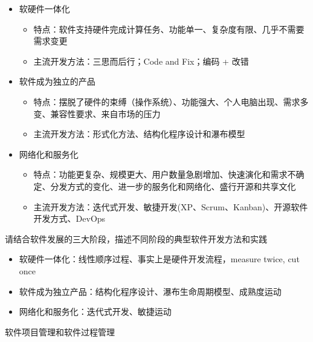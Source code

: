\begin{solution}
\begin{itemize}
    \item 软硬件一体化
    \begin{itemize}
        \item 特点：软件支持硬件完成计算任务、功能单一、复杂度有限、几乎不需要需求变更
        \item 主流开发方法：三思而后行；Code and Fix；编码 + 改错
    \end{itemize}
    \item 软件成为独立的产品
    \begin{itemize}
        \item 特点：摆脱了硬件的束缚（操作系统）、功能强大、个人电脑出现、需求多变、兼容性要求、来自市场的压力
        \item 主流开发方法：形式化方法、结构化程序设计和瀑布模型
    \end{itemize}
    \item 网络化和服务化
    \begin{itemize}
        \item 特点：功能更复杂、规模更大、用户数量急剧增加、快速演化和需求不确定、分发方式的变化、进一步的服务化和网络化、盛行开源和共享文化
        \item 主流开发方法：迭代式开发、敏捷开发(XP、Scrum、Kanban)、开源软件开发方式、DevOps
    \end{itemize}
\end{itemize}
\end{solution}



\begin{problem}[2020]
请结合软件发展的三大阶段，描述不同阶段的典型软件开发方法和实践
\end{problem}

\begin{solution}
\begin{itemize}
    \item 软硬件一体化：线性顺序过程、事实上是硬件开发流程，measure twice, cut once
    \item 软件成为独立产品：结构化程序设计、瀑布生命周期模型、成熟度运动
    \item 网络化和服务化：迭代式开发、敏捷运动
\end{itemize}
\end{solution}



\begin{problem}[2018]
软件项目管理和软件过程管理
\end{problem}

